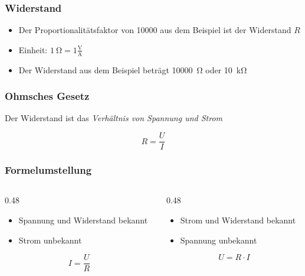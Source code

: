 \begin{frame}
\frametitle{Widerstand}
\begin{itemize}
  \item Der Proportionalitätsfaktor von 10000 aus dem Beispiel ist der Widerstand $R$
  \item Einheit: $\qty{1}{\ohm} = 1 \frac{\text{V}}{\text{A}}$
  \item Der Widerstand aus dem Beispiel beträgt \qty{10000}{\ohm} oder \qty{10}{\kilo\ohm}
  \end{itemize}
\end{frame}

\begin{frame}
\frametitle{Ohmsches Gesetz}
Der Widerstand ist das \emph{Verhältnis von Spannung und Strom}

$$ R = \dfrac{U}{I} $$

\end{frame}

\begin{frame}
\end{frame}

\begin{frame}
\frametitle{Formelumstellung}
\begin{columns}
    \begin{column}{0.48\textwidth}
    \begin{itemize}
  \item Spannung und Widerstand bekannt
  \item Strom unbekannt
  \end{itemize}
$$ I = \dfrac{U}{R} $$


    \end{column}
   \begin{column}{0.48\textwidth}
       \begin{itemize}
  \item Strom und Widerstand bekannt
  \item Spannung unbekannt
  \end{itemize}

$$ U = R\cdot I $$

   \end{column}
\end{columns}

\end{frame}

